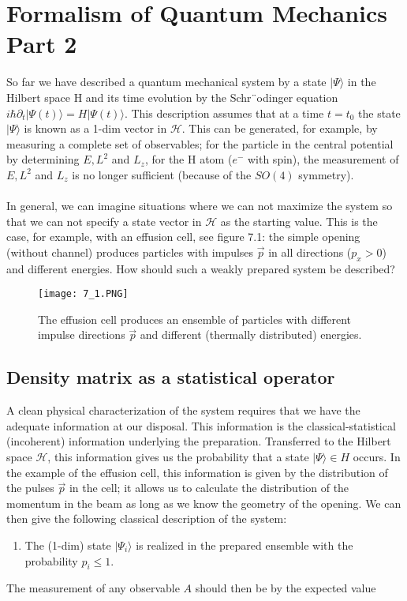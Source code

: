 \chapter{Formalism of Quantum Mechanics Part 2}
So far we have described a quantum mechanical system by a state $|\Psi\rangle$ in the Hilbert space H and its time evolution by the Schr¨odinger equation $i\hbar\partial_t|\Psi(t)\rangle=H|\Psi(t)\rangle$. This description assumes that at a time $t = t_0$ the state $|\Psi\rangle$ is known as a 1-dim vector in $\mathcal{H}$. This can be generated, for example, by measuring a complete set of observables; for the particle in the central potential by determining $E, L^2$ and $L_z$, for the H atom ($e ^-$ with spin), the measurement of $E, L^2$ and $L_z$ is no longer sufficient (because of the $SO (4)$ symmetry). \\\\In general, we can imagine situations where we can not maximize the system so that we can not specify a state vector in $\mathcal{H}$ as the starting value. This is the case, for example, with an effusion cell, see figure 7.1: the simple opening (without channel) produces particles with impulses $\vec{p}$ in all directions ($p_x> 0$) and different energies. How should such a weakly prepared system be described?
\begin{figure}[ht]
    \begin{minipage}{0.6\textwidth}
        \centering
        \texttt{[image: 7\_1.PNG]}
    \end{minipage}
    \begin{minipage}{0.4\textwidth}
        \caption{The effusion cell produces an ensemble of particles with different impulse directions $\vec{p}$ and different (thermally distributed) energies.}
    \end{minipage}
\end{figure}

\section{Density matrix as a statistical operator}
A clean physical characterization of the system requires that we have the adequate information at our disposal. This information is the classical-statistical (incoherent) information underlying the preparation. Transferred to the Hilbert space $\mathcal{H}$, this information gives us the probability that a state $|\Psi\rangle\in H$ occurs. In the example of the effusion cell, this information is given by the distribution of the pulses $\vec{p}$ in the cell; it allows us to calculate the distribution of the momentum in the beam as long as we know the geometry of the opening. We can then give the following classical description of the system:
\begin{enumerate}
    \item[] The (1-dim) state $|\Psi_i\rangle$ is realized in the prepared ensemble with the probability $p_i \leq 1$.
\end{enumerate}
The measurement of any observable $A$ should then be by the expected value


